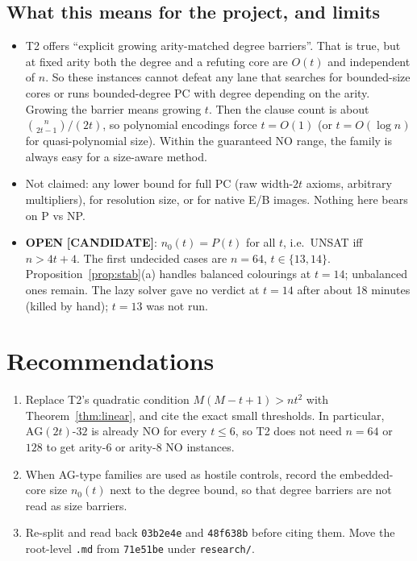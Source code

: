 \documentclass[11pt]{article}
\theoremstyle{definition}
\theoremstyle{remark}
\newcommand{\lab}[1]{\textbf{[#1]}}
\newcommand{\AG}{\mathrm{AG}}
\begin{document}
\subsection{What this means for the project, and limits}
\begin{itemize}
\item T2 offers ``explicit growing arity-matched degree barriers''. That is true, but at fixed
arity both the degree and a refuting core are $O(t)$ and independent of $n$. So these
instances cannot defeat any lane that searches for bounded-size cores or runs bounded-degree
PC with degree depending on the arity. Growing the barrier means growing $t$. Then the clause
count is about $\binom{n}{2t-1}/(2t)$, so polynomial encodings force $t=O(1)$ (or
$t=O(\log n)$ for quasi-polynomial size). Within the guaranteed NO range, the family is
always easy for a size-aware method.
\item Not claimed: any lower bound for full PC (raw width-$2t$ axioms, arbitrary
multipliers), for resolution size, or for native E/B images. Nothing here bears on P vs NP.
\item \textbf{OPEN} \lab{CANDIDATE}: $n_0(t)=P(t)$ for all $t$, i.e.\ UNSAT iff $n>4t+4$. The
first undecided cases are $n=64$, $t\in\{13,14\}$. Proposition~\ref{prop:stab}(a) handles
balanced colourings at $t=14$; unbalanced ones remain. The lazy solver gave no verdict at $t=14$ after about 18 minutes (killed by hand); $t=13$ was not run.
\end{itemize}

\section*{Recommendations}
\begin{enumerate}
\item Replace T2's quadratic condition $M(M-t+1)>nt^2$ with Theorem~\ref{thm:linear}, and cite
the exact small thresholds. In particular, $\AG(2t)$-$32$ is already NO for every
$t\le6$, so T2 does not need $n=64$ or $128$ to get arity-6 or arity-8 NO instances.
\item When AG-type families are used as hostile controls, record the embedded-core size
$n_0(t)$ next to the degree bound, so that degree barriers are not read as size barriers.
\item Re-split and read back \texttt{03b2e4e} and \texttt{48f638b} before citing them. Move the
root-level \texttt{.md} from \texttt{71e51be} under \texttt{research/}.
\end{enumerate}
\end{document}
